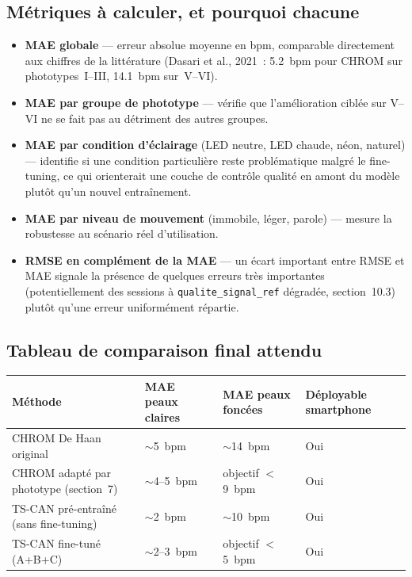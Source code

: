 \documentclass[11pt,a4paper]{article}
\begin{document}
\subsection{M\'etriques \`a calculer, et pourquoi chacune}

\begin{itemize}
\item \textbf{MAE globale} --- erreur absolue moyenne en bpm, comparable
directement aux chiffres de la litt\'erature (Dasari et al., 2021~: 5.2~bpm
pour CHROM sur phototypes~I--III, 14.1~bpm sur~V--VI).
\item \textbf{MAE par groupe de phototype} --- v\'erifie que
l'am\'elioration cibl\'ee sur V--VI ne se fait pas au d\'etriment des autres
groupes.
\item \textbf{MAE par condition d'\'eclairage} (LED neutre, LED chaude,
n\'eon, naturel) --- identifie si une condition particuli\`ere reste
probl\'ematique malgr\'e le fine-tuning, ce qui orienterait une couche de
contr\^ole qualit\'e en amont du mod\`ele plut\^ot qu'un nouvel
entra\^inement.
\item \textbf{MAE par niveau de mouvement} (immobile, l\'eger, parole) ---
mesure la robustesse au sc\'enario r\'eel d'utilisation.
\item \textbf{RMSE en compl\'ement de la MAE} --- un \'ecart important entre
RMSE et MAE signale la pr\'esence de quelques erreurs tr\`es importantes
(potentiellement des sessions \`a \texttt{qualite\_signal\_ref} d\'egrad\'ee,
section~10.3) plut\^ot qu'une erreur uniform\'ement r\'epartie.
\end{itemize}

\subsection{Tableau de comparaison final attendu}

\begin{center}
\begin{tabularx}{\textwidth}{X P{2.6cm} P{2.6cm} P{2.4cm}}
\toprule
\textbf{M\'ethode} & MAE peaux claires & MAE peaux fonc\'ees &
D\'eployable smartphone \\
\midrule
CHROM De Haan original & $\sim$5~bpm & $\sim$14~bpm & Oui \\
CHROM adapt\'e par phototype (section~7) & $\sim$4--5~bpm & objectif
$<$9~bpm & Oui \\
TS-CAN pr\'e-entra\^in\'e (sans fine-tuning) & $\sim$2~bpm & $\sim$10~bpm &
Oui \\
TS-CAN fine-tun\'e (A+B+C) & $\sim$2--3~bpm & objectif $<$5~bpm & Oui \\
\bottomrule
\end{tabularx}
\end{center}
\end{document}
